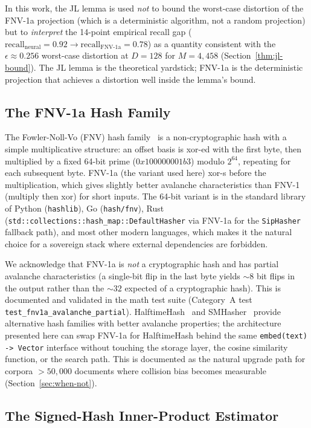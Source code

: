 \documentclass[10pt,twocolumn]{article}
\theoremstyle{definition}
\theoremstyle{remark}
\begin{document}
In this work, the JL lemma is used \emph{not} to bound the worst-case
distortion of the FNV-1a projection (which is a deterministic algorithm,
not a random projection) but to \emph{interpret} the 14-point empirical
recall gap ($\text{recall}_{\text{neural}} = 0.92 \to
\text{recall}_{\text{FNV-1a}} = 0.78$) as a quantity consistent with the
$\epsilon \approx 0.256$ worst-case distortion at $D = 128$ for $M =
4{,}458$ (Section~\ref{thm:jl-bound}). The JL lemma is the theoretical
yardstick; FNV-1a is the deterministic projection that achieves a
distortion well inside the lemma's bound.

\subsection{The FNV-1a Hash Family}

The Fowler-Noll-Vo (FNV) hash family~\citep{fnv2004} is a non-cryptographic
hash with a simple multiplicative structure: an offset basis is
xor-ed with the first byte, then multiplied by a fixed 64-bit prime
($0x100000001b3$) modulo $2^{64}$, repeating for each subsequent byte.
FNV-1a (the variant used here) xor-s before the multiplication, which
gives slightly better avalanche characteristics than FNV-1 (multiply
then xor) for short inputs. The 64-bit variant is in the standard library
of Python (\texttt{hashlib}), Go (\texttt{hash/fnv}), Rust
(\texttt{std::collections::hash\_map::DefaultHasher} via FNV-1a for the
\texttt{SipHasher} fallback path), and most other modern languages, which
makes it the natural choice for a sovereign stack where external
dependencies are forbidden.

We acknowledge that FNV-1a is \emph{not} a cryptographic hash and has
partial avalanche characteristics (a single-bit flip in the last byte
yields $\sim 8$ bit flips in the output rather than the $\sim 32$ expected
of a cryptographic hash). This is documented and validated in the
math test suite (Category~A test
\texttt{test\_fnv1a\_avalanche\_partial}). HalftimeHash~\citep{halftime2021}
and SMHasher~\citep{smhasher2019} provide alternative hash families with
better avalanche properties; the architecture presented here can swap
FNV-1a for HalftimeHash behind the same \texttt{embed(text) -> Vector}
interface without touching the storage layer, the cosine similarity
function, or the search path. This is documented as the natural upgrade
path for corpora $> 50{,}000$ documents where collision bias becomes
measurable (Section~\ref{sec:when-not}).

\subsection{The Signed-Hash Inner-Product Estimator}
\end{document}
